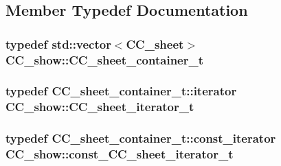 \subsection{Member Typedef Documentation}
\hypertarget{a00046_a1a6e11ead9a97c796881971059c56f37}{
\subsubsection[{C\-C\-\_\-sheet\-\_\-container\-\_\-t}]{\setlength{\rightskip}{0pt plus 5cm}typedef std\-::vector$<${\bf C\-C\-\_\-sheet}$>$ {\bf C\-C\-\_\-show\-::\-C\-C\-\_\-sheet\-\_\-container\-\_\-t}}}\label{a00046_a1a6e11ead9a97c796881971059c56f37}
\hypertarget{a00046_a53c7d0b304ced90d330ea5076f1bee89}{
\subsubsection[{C\-C\-\_\-sheet\-\_\-iterator\-\_\-t}]{\setlength{\rightskip}{0pt plus 5cm}typedef C\-C\-\_\-sheet\-\_\-container\-\_\-t\-::iterator {\bf C\-C\-\_\-show\-::\-C\-C\-\_\-sheet\-\_\-iterator\-\_\-t}}}\label{a00046_a53c7d0b304ced90d330ea5076f1bee89}
\hypertarget{a00046_aaaf1345012d2f833d1c8f28f9b8593ff}{
\subsubsection[{const\-\_\-\-C\-C\-\_\-sheet\-\_\-iterator\-\_\-t}]{\setlength{\rightskip}{0pt plus 5cm}typedef C\-C\-\_\-sheet\-\_\-container\-\_\-t\-::const\-\_\-iterator {\bf C\-C\-\_\-show\-::const\-\_\-\-C\-C\-\_\-sheet\-\_\-iterator\-\_\-t}}}\label{a00046_aaaf1345012d2f833d1c8f28f9b8593ff}


